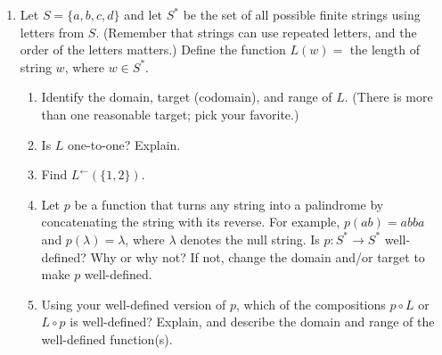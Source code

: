 \documentclass{article}
\begin{document}
\begin{enumerate}
\item Let $S =\{a,b,c,d\}$ and let $S^*$ be the set of all possible finite strings using letters from $S$. (Remember that strings can use repeated letters, and the order of the letters matters.)  Define the function $L(w) = $ the length of string $w$, where $w \in S^*$.
\begin{enumerate}
	\item Identify the domain, target (codomain), and range of $L$. (There is more than one reasonable target; pick your favorite.)%
	\item Is $L$ one-to-one?  Explain.
	\item Find $L^{\leftarrow}(\{1,2\})$. 
	\item Let $p$ be a function that turns any string into a palindrome by concatenating the string with its reverse.  For example, $p(ab) = abba$ and $p(\lambda)=\lambda$, where $\lambda$ denotes the null string. Is $p:S^* \to S^*$ well-defined?  Why or why not?  If not, change the domain and/or target to make $p$ well-defined.
	\item Using your well-defined version of $p$, which of the compositions $p \circ L$  or $L \circ p$ is well-defined? Explain, and describe the domain and range of the well-defined function(s).
\end{enumerate}

\end{enumerate}
\end{document}
